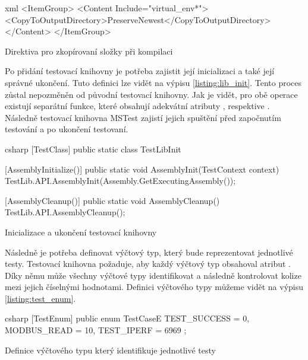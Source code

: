 \begin{listing}[htbp]
    \centering
    \begin{cminted}[breaklines,autogobble, fontsize=\footnotesize]{xml}
<ItemGroup>
    <Content Include="virtual_env\**">
        <CopyToOutputDirectory>PreserveNewest</CopyToOutputDirectory>
    </Content>
</ItemGroup>
    \end{cminted}
\caption{Direktiva pro zkopírovaní složky při kompilaci}
\label{listing:copy_virtual_env}
\end{listing}


Po přidání testovací knihovny je potřeba zajistit její inicializaci a také její správné ukončení. Tuto definici lze vidět na výpisu \ref{listing:lib_init}. Tento proces zůstal nepozměněn od původní testovací knihovny. Jak je vidět, pro obě operace existují separátní funkce, které obsahují adekvátní atributy , respektive . Následně testovací knihovna MSTest zajistí jejich spuštění před započnutím testování a po ukončení testovaní.  

\begin{listing}[htbp]
    \centering
    \begin{cminted}[breaklines,autogobble, fontsize=\small]{csharp}
[TestClass]
public static class TestLibInit
{
    [AssemblyInitialize()]
    public static void AssemblyInit(TestContext context)
    {
        TestLib.API.AssemblyInit(Assembly.GetExecutingAssembly());
    }

    [AssemblyCleanup()]
    public static void AssemblyCleanup()
    {
        TestLib.API.AssemblyCleanup();
    }
}
    \end{cminted}
\caption{Inicializace a ukončení testovací knihovny}
\label{listing:lib_init}
\end{listing}

Následně je potřeba definovat výčtový typ, který bude reprezentovat jednotlivé testy. Testovací knihovna požaduje, aby každý výčtový typ obsahoval atribut . Díky němu může všechny výčtové typy identifikovat a následně kontrolovat kolize mezi jejich číselnými hodnotami. Definici výčtového typy můžeme vidět na výpisu \ref{listing:test_enum}. 

\begin{listing}[htbp]
    \centering
    \begin{cminted}[breaklines,autogobble, fontsize=\small]{csharp}
[TestEnum]
public enum TestCaseE
{
    TEST_SUCCESS = 0,
    MODBUS_READ = 10,
    TEST_IPERF = 6969
};
    \end{cminted}
\caption{Definice výčtového typu který identifikuje jednotlivé testy}
\label{listing:test_enum}
\end{listing}

